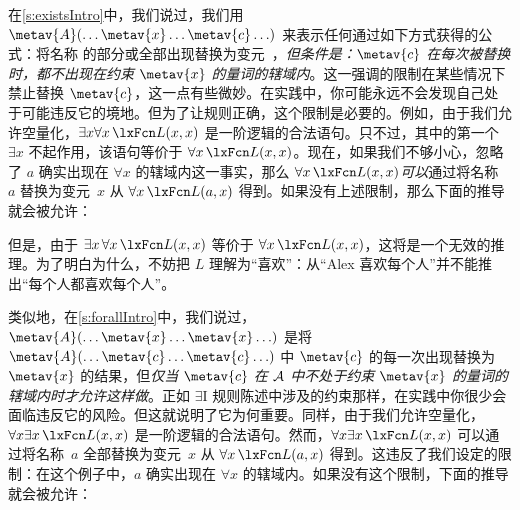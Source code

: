 在\cref{s:existsIntro}中，我们说过，我们用 $\metav{A}(\ldots
\metav{x} \ldots \metav{c}\ldots)$ 来表示任何通过如下方式获得的公式：将名称  的部分或全部出现替换为变元~，\emph{但条件是：$\metav{c}$ 在每次被替换时，都不出现在约束 $\metav{x}$ 的量词的辖域内}。这一强调的限制在某些情况下禁止替换 $\metav{c}$，这一点有些微妙。在实践中，你可能永远不会发现自己处于可能违反它的境地。但为了让规则正确，这个限制是必要的。例如，由于我们允许空量化，$\exists
x\forall x\,\atom{L}{x,x}$ 是一阶逻辑的合法语句。只不过，其中的第一个 $\exists x$ 不起作用，该语句等价于 $\forall x\,\atom{L}{x,x}$。现在，如果我们不够小心，忽略了 $a$ 确实出现在 $\forall x$ 的辖域内这一事实，那么 $\forall
x\,\atom{L}{x,x}$\emph{可以}通过将名称~$a$ 替换为变元~$x$ 从 $\forall
x\,\atom{L}{a,x}$ 得到。如果没有上述限制，那么下面的推导就会被允许：


\begin{fitchproof}
		\PR
		\ifHTMLtarget
	\else
	\fi\end{fitchproof}


但是，由于 $\exists x\, \forall x\, \atom{L}{x,x}$ 等价于 $\forall x\, \atom{L}{x,x}$，这将是一个无效的推理。为了明白为什么，不妨把 $L$ 理解为“喜欢”：从“Alex 喜欢每个人”并不能推出“每个人都喜欢每个人”。

类似地，在\cref{s:forallIntro}中，我们说过，$\metav{A}(\ldots
\metav{x} \ldots \metav{x}\ldots)$ 是将 $\metav{A}(\ldots \metav{c}
\ldots \metav{c}\ldots)$ 中 $\metav{c}$ 的每一次出现替换为 $\metav{x}$ 的结果，但\emph{仅当 $\metav{c}$ 在 $\mathcal{A}$ 中不处于约束 $\metav{x}$ 的量词的辖域内时才允许这样做}。正如 $\exists$I 规则陈述中涉及的约束那样，在实践中你很少会面临违反它的风险。但这就说明了它为何重要。同样，由于我们允许空量化，$\forall
x\exists x\,\atom{L}{x,x}$ 是一阶逻辑的合法语句。然而，$\forall x\exists x\,\atom{L}{x,x}$ 可以通过将名称~$a$ 全部替换为变元~$x$ 从 $\forall
x\,\atom{L}{a,x}$ 得到。这违反了我们设定的限制：在这个例子中，$a$ 确实出现在 $\forall x$ 的辖域内。如果没有这个限制，下面的推导就会被允许：


\begin{fitchproof}
	\PR
\ifHTMLtarget
\else
{}
\fi
\end{fitchproof}


